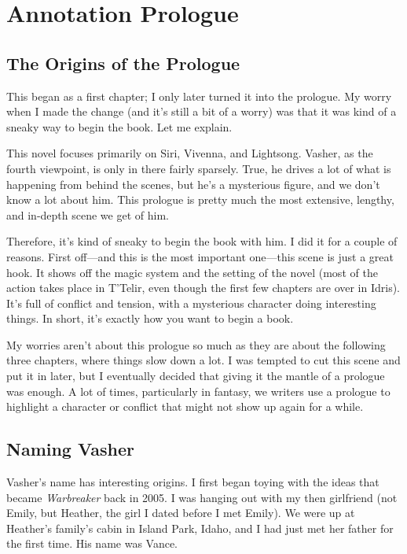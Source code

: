 \section{Annotation Prologue}

\subsection*{The Origins of the Prologue}

This began as a first chapter; I only later turned it into the prologue. My worry when I made the change (and it’s still a bit of a worry) was that it was kind of a sneaky way to begin the book. Let me explain.

This novel focuses primarily on Siri, Vivenna, and Lightsong. Vasher, as the fourth viewpoint, is only in there fairly sparsely. True, he drives a lot of what is happening from behind the scenes, but he’s a mysterious figure, and we don’t know a lot about him. This prologue is pretty much the most extensive, lengthy, and in-depth scene we get of him.

Therefore, it’s kind of sneaky to begin the book with him. I did it for a couple of reasons. First off—and this is the most important one—this scene is just a great hook. It shows off the magic system and the setting of the novel (most of the action takes place in T’Telir, even though the first few chapters are over in Idris). It’s full of conflict and tension, with a mysterious character doing interesting things. In short, it’s exactly how you want to begin a book.

My worries aren’t about this prologue so much as they are about the following three chapters, where things slow down a lot. I was tempted to cut this scene and put it in later, but I eventually decided that giving it the mantle of a prologue was enough. A lot of times, particularly in fantasy, we writers use a prologue to highlight a character or conflict that might not show up again for a while.

\subsection*{Naming Vasher}

Vasher’s name has interesting origins. I first began toying with the ideas that became \textit{Warbreaker} back in 2005. I was hanging out with my then girlfriend (not Emily, but Heather, the girl I dated before I met Emily). We were up at Heather’s family’s cabin in Island Park, Idaho, and I had just met her father for the first time. His name was Vance.

